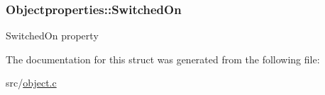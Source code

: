 \subsubsection[{\texorpdfstring{Switched\+On}{SwitchedOn}}]{ Objectproperties\+::\+Switched\+On}\hypertarget{structObjectproperties_a53e5cff11358955ab939ac4066aee6ff}{}\label{structObjectproperties_a53e5cff11358955ab939ac4066aee6ff}
Switched\+On property 

The documentation for this struct was generated from the following file\+:\begin{DoxyCompactItemize}
\item 
src/\hyperlink{object_8c}{object.\+c}\end{DoxyCompactItemize}
